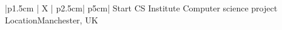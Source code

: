 
%
\iftrue %
\begin{myTableEnv}{|p{1.5cm} | X | p{2.5cm}| p{5cm}|}
    \myRow
        {Start}{}
        {}{CS Institute}
    \myRow
        {}{Computer science project}
        {Location}{Manchester, UK}
\end{myTableEnv}
%
\fi
%